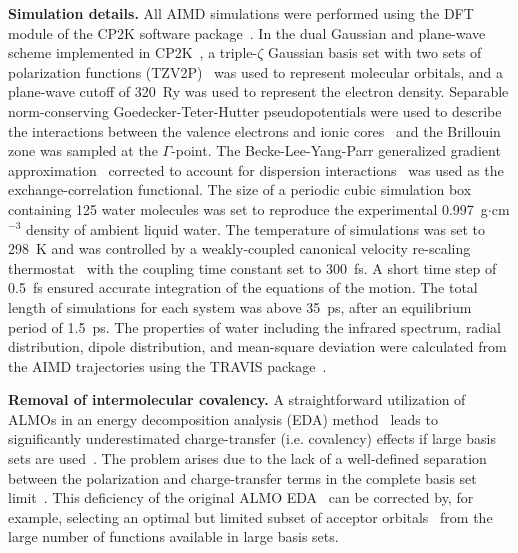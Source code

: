 \documentclass[aps,prl,reprint,amsmath,amssymb]{revtex4-1}
\begin{document}
\textbf{Simulation details.} All AIMD simulations were performed using the DFT module of the CP2K software package~\cite{www:cp2k}. 
In the dual Gaussian and plane-wave scheme implemented in CP2K~\cite{hutter2014cp2k}, a triple-$\zeta$ Gaussian basis set with two sets of polarization functions (TZV2P)~\cite{vandevondele2007gaussian} was used to represent molecular orbitals, and a plane-wave cutoff of 320~Ry was used to represent the electron density. 
Separable norm-conserving Goedecker-Teter-Hutter pseudopotentials were used to describe the interactions between the valence electrons and ionic cores~\cite{goedecker1996separable,krack2005pseudopotentials} and the Brillouin zone was sampled at the $\Gamma$-point. 
The Becke-Lee-Yang-Parr generalized gradient approximation~\cite{becke1988density, lee1988development} corrected to account for dispersion interactions~\cite{grimme2010consistent} was used as the exchange-correlation functional. 
The size of a periodic cubic simulation box containing 125 water molecules was set to reproduce the experimental 0.997~g$\cdot$cm$^{-3}$ density of ambient liquid water. 
The temperature of simulations was set to 298~K and was controlled by a weakly-coupled canonical velocity re-scaling thermostat~\cite{bussi2007canonical} with the coupling time constant set to 300~fs. 
A short time step of 0.5~fs ensured accurate integration of the equations of the motion. 
The total length of simulations for each system was above 35~ps, after an equilibrium period of 1.5~ps. 
The properties of water including the infrared spectrum, radial distribution, dipole distribution, and mean-square deviation were calculated from the AIMD trajectories using the TRAVIS package~\cite{brehm2011travis}.  

\textbf{Removal of intermolecular covalency.} A straightforward utilization of ALMOs in an energy decomposition analysis (EDA) method~\cite{khaliullin2007unravelling} leads to significantly underestimated charge-transfer (i.e. covalency) effects if large basis sets are used~\cite{horn2015polarization,lao2016energy}. 
The problem arises due to the lack of a well-defined separation between the polarization and charge-transfer terms in the complete basis set limit~\cite{misquitta2013charge,horn2015polarization}. 
This deficiency of the original ALMO EDA~\cite{khaliullin2007unravelling} can be corrected by, for example, selecting an optimal but limited subset of acceptor orbitals~\cite{horn2015polarization} from the large number of functions available in large basis sets. 
\end{document}
